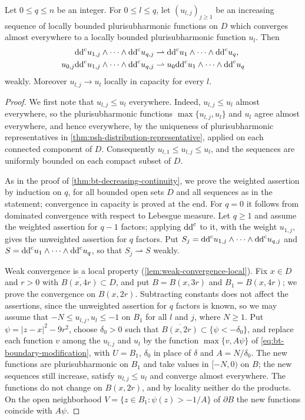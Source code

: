 \begin{theorem}\label{thm:bt-increasing-continuity}
Let $0\le q\le n$ be an integer. For $0\le l\le q$, let $(u_{l,j})_{j\ge1}$ be an increasing sequence of locally bounded plurisubharmonic functions on $D$ which converges almost everywhere to a locally bounded plurisubharmonic function $u_l$. Then
\[
 \begin{aligned}
 \mathrm{dd}^{\mathrm{c}} u_{1,j}\wedge\cdots\wedge\mathrm{dd}^{\mathrm{c}} u_{q,j}
 &\rightharpoonup\mathrm{dd}^{\mathrm{c}} u_1\wedge\cdots\wedge\mathrm{dd}^{\mathrm{c}} u_q,\\
 u_{0,j}\mathrm{dd}^{\mathrm{c}} u_{1,j}\wedge\cdots\wedge\mathrm{dd}^{\mathrm{c}} u_{q,j}
 &\rightharpoonup u_0\mathrm{dd}^{\mathrm{c}} u_1\wedge\cdots\wedge\mathrm{dd}^{\mathrm{c}} u_q
 \end{aligned}
\]
weakly. Moreover $u_{l,j}\to u_l$ locally in capacity for every $l$.
\end{theorem}
\begin{proof}
We first note that $u_{l,j}\le u_l$ everywhere. Indeed, $u_{l,j}\le u_l$ almost everywhere, so the plurisubharmonic functions $\max\{u_{l,j},u_l\}$ and $u_l$ agree almost everywhere, and hence everywhere, by the uniqueness of plurisubharmonic representatives in \cref{thm:psh-distribution-representative}, applied on each connected component of $D$. Consequently $u_{l,1}\le u_{l,j}\le u_l$, and the sequences are uniformly bounded on each compact subset of $D$.

As in the proof of \cref{thm:bt-decreasing-continuity}, we prove the weighted assertion by induction on $q$, for all bounded open sets $D$ and all sequences as in the statement; convergence in capacity is proved at the end. For $q=0$ it follows from dominated convergence with respect to Lebesgue measure. Let $q\ge1$ and assume the weighted assertion for $q-1$ factors; applying $\mathrm{dd}^{\mathrm{c}}$ to it, with the weight $u_{1,j}$, gives the unweighted assertion for $q$ factors. Put $S_j=\mathrm{dd}^{\mathrm{c}} u_{1,j}\wedge\cdots\wedge\mathrm{dd}^{\mathrm{c}} u_{q,j}$ and $S=\mathrm{dd}^{\mathrm{c}} u_1\wedge\cdots\wedge\mathrm{dd}^{\mathrm{c}} u_q$, so that $S_j\rightharpoonup S$ weakly.

Weak convergence is a local property (\cref{lem:weak-convergence-local}). Fix $x\in D$ and $r>0$ with $\overline{B(x,4r)}\subset D$, and put $B=B(x,3r)$ and $B_1=B(x,4r)$; we prove the convergence on $B(x,2r)$. Subtracting constants does not affect the assertions, since the unweighted assertion for $q$ factors is known, so we may assume that $-N\le u_{l,j},u_l\le-1$ on $B_1$ for all $l$ and $j$, where $N\ge1$. Put $\psi=|z-x|^2-9r^2$, choose $\delta_0>0$ such that $\overline{B(x,2r)}\subset\{\psi<-\delta_0\}$, and replace each function $v$ among the $u_{l,j}$ and $u_l$ by the function $\max\{v,A\psi\}$ of \eqref{eq:bt-boundary-modification}, with $U=B_1$, $\delta_0$ in place of $\delta$ and $A=N/\delta_0$. The new functions are plurisubharmonic on $B_1$ and take values in $[-N,0)$ on $B$; the new sequences still increase, satisfy $u_{l,j}\le u_l$ and converge almost everywhere. The functions do not change on $B(x,2r)$, and by locality neither do the products. On the open neighborhood $V=\{z\in B_1:\psi(z)>-1/A\}$ of $\partial B$ the new functions coincide with $A\psi$.


\end{proof}
